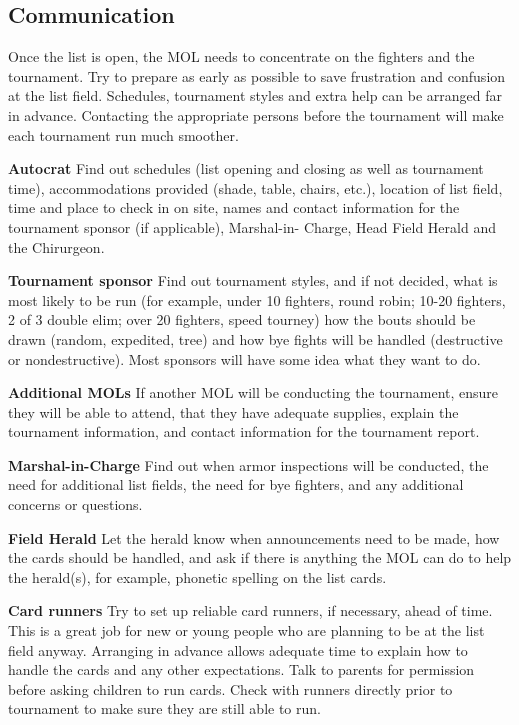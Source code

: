 \documentclass{article}
\begin{document}
\subsection{Communication}

Once the list is open, the MOL needs to concentrate on the fighters and the tournament. Try to prepare as
early as possible to save frustration and confusion at the list field. Schedules, tournament styles and extra
help can be arranged far in advance. Contacting the appropriate persons before the tournament will make
each tournament run much smoother.

\textbf{Autocrat} Find out schedules (list opening and closing as well as tournament
time), accommodations provided (shade, table, chairs, etc.), location
of list field, time and place to check in on site, names and contact
information for the tournament sponsor (if applicable), Marshal-in-
Charge, Head Field Herald and the Chirurgeon.

\textbf{Tournament sponsor} Find out tournament styles, and if not decided, what is most likely to
be run (for example, under 10 fighters, round robin; 10-20 fighters, 2
of 3 double elim; over 20 fighters, speed tourney) how the bouts
should be drawn (random, expedited, tree) and how bye fights will
be handled (destructive or nondestructive). Most sponsors will have
some idea what they want to do.

\textbf{Additional MOLs} If another MOL will be conducting the tournament, ensure they will
be able to attend, that they have adequate supplies, explain the
tournament information, and contact information for the tournament
report.

\textbf{Marshal-in-Charge} Find out when armor inspections will be conducted, the need for
additional list fields, the need for bye fighters, and any additional
concerns or questions.

\textbf{Field Herald} Let the herald know when announcements need to be made, how the
cards should be handled, and ask if there is anything the MOL can
do to help the herald(s), for example, phonetic spelling on the list
cards.

\textbf{Card runners} Try to set up reliable card runners, if necessary, ahead of time. This
is a great job for new or young people who are planning to be at the
list field anyway. Arranging in advance allows adequate time to
explain how to handle the cards and any other expectations. Talk to
parents for permission before asking children to run cards. Check
with runners directly prior to tournament to make sure they are still
able to run.
\end{document}
